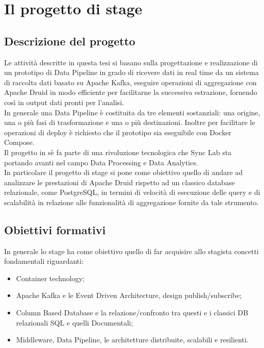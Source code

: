 \section{Il progetto di stage}
\subsection{Descrizione del progetto}
Le attività descritte in questa tesi si basano sulla progettazione e realizzazione di un prototipo di \gls{Data Pipeline}{} in grado di ricevere dati in real time da un sistema di raccolta dati basato su Apache Kafka, eseguire operazioni di aggregazione con Apache Druid in modo efficiente per facilitarne la successiva estrazione, fornendo così in output dati pronti per l'analisi.\\
In generale una \gls{Data Pipeline}{} è costituita da tre elementi sostanziali: una origine, una o più fasi di trasformazione e una o più destinazioni.
Inoltre per facilitare le operazioni di deploy è richiesto che il prototipo sia eseguibile con Docker Compose. \\
Il progetto in sè fa parte di una rivoluzione tecnologica che Sync Lab sta portando avanti nel campo Data Processing e Data Analytics. \\
In particolare il progetto di stage si pone come obiettivo quello di andare ad analizzare le prestazioni di Apache Druid rispetto ad un classico database relazionale, come PostgreSQL, in termini di velocità di esecuzione delle query e di scalabilità in relazione alle funzionalità di aggregazione fornite da tale strumento. 
\subsection{Obiettivi formativi}
In generale lo stage ha come obiettivo quello di far acquisire allo stagista concetti fondamentali riguardanti: 
\begin{itemize}
    \item Container technology;
    \item Apache Kafka e le Event Driven Architecture, design publish/subscribe;
    \item Column Based Database e la relazione/confronto tra questi e i classici DB relazionali SQL e quelli
    Documentali;
    \item Middleware, \gls{Data Pipeline}{}, le architetture distribuite, scalabili e resilienti.
\end{itemize}
